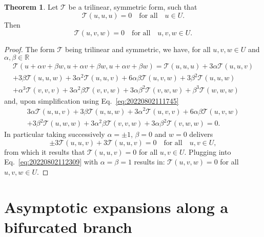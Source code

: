 \documentclass[12pt, final]{scrartcl}
\theoremstyle{definition}
\newtheorem{theorem}{Theorem}
\newcommand{\reals}{\mathbb{R}}
\begin{document}
\begin{theorem}
  \label{thr:20220802112835}
  Let $\mathcal T$ be a trilinear, symmetric form, such that
  \begin{equation}
    \label{eq:20220802111745}
    \mathcal T(u, u, u) = 0 \quad \text{for all} \quad u \in U.
  \end{equation}
  Then
  \begin{equation}
    \mathcal T(u, v, w) = 0 \quad \text{for all} \quad u, v, w \in U.
  \end{equation}
\end{theorem}
\begin{proof}
  The form $\mathcal T$ being trilinear and symmetric, we have, for all $u, v, w \in U$ and $\alpha, \beta \in \reals$
  \begin{multline*}
    \mathcal T(u + \alpha v + \beta w, u + \alpha v + \beta w, u + \alpha v + \beta w) = \mathcal T(u, u, u) + 3\alpha \mathcal T(u, u, v)\\
    + 3\beta \mathcal T(u, u, w) + 3\alpha^2 \mathcal T(u, u, v) + 6 \alpha \beta \mathcal T(u, v, w) + 3 \beta^2 \mathcal T(u, u, w)\\
    + \alpha^3 \mathcal T(v, v, v) + 3 \alpha^2 \beta \mathcal T(v, v, w) + 3 \alpha \beta^2 \mathcal T(v, w, w) + \beta^3 \mathcal T(w, w, w)
  \end{multline*}
  and, upon simplification using Eq.~\eqref{eq:20220802111745}
  \begin{multline}
    \label{eq:20220802112309}
    3\alpha \mathcal T(u, u, v) + 3\beta \mathcal T(u, u, w) + 3\alpha^2 \mathcal T(u, v, v) + 6 \alpha \beta \mathcal T(u, v, w)\\
    + 3 \beta^2 \mathcal T(u, w, w) + 3 \alpha^2 \beta \mathcal T(v, v, w) + 3 \alpha \beta^2 \mathcal T(v, w, w) = 0.
  \end{multline}
  In particular taking successively $\alpha = ±1$, $\beta = 0$ and $w = 0$ delivers
  \begin{equation*}
    ±3 \mathcal T(u, u, v) + 3 \mathcal T(u, u, v) = 0 \quad \text{for all} \quad u, v \in U,
  \end{equation*}
  from which it results that $\mathcal T(u, u, v) = 0$ for all $u, v \in U$. Plugging into Eq.~\eqref{eq:20220802112309}
  with $\alpha = \beta = 1$ results in: $\mathcal T(u, v, w) = 0$ for all $u, v, w \in U$.
\end{proof}

\section{Asymptotic expansions along a bifurcated branch}
\label{sec:20220905060440}
\end{document}
